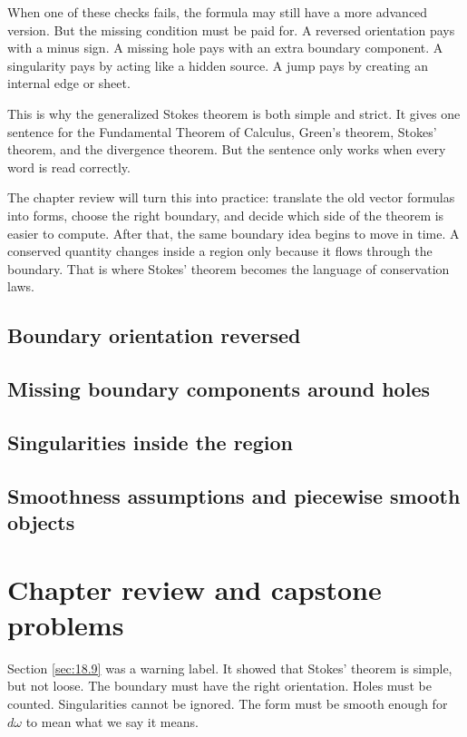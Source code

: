 When one of these checks fails, the formula may still have a more advanced version.
But the missing condition must be paid for.  A reversed orientation pays with a minus
sign.  A missing hole pays with an extra boundary component.  A singularity pays by
acting like a hidden source.  A jump pays by creating an internal edge or sheet.

This is why the generalized Stokes theorem is both simple and strict.  It gives one
sentence for the Fundamental Theorem of Calculus, Green's theorem, Stokes' theorem,
and the divergence theorem.  But the sentence only works when every word is read
correctly.

The chapter review will turn this into practice: translate the old vector formulas into
forms, choose the right boundary, and decide which side of the theorem is easier to
compute.  After that, the same boundary idea begins to move in time.  A conserved
quantity changes inside a region only because it flows through the boundary.  That is
where Stokes' theorem becomes the language of conservation laws.


\subsection{Boundary orientation reversed}

\subsection{Missing boundary components around holes}

\subsection{Singularities inside the region}

\subsection{Smoothness assumptions and piecewise smooth objects}

\section{Chapter review and capstone problems}
\label{sec:18.10}

Section \ref{sec:18.9} was a warning label.  It showed that Stokes' theorem is simple,
but not loose.  The boundary must have the right orientation.  Holes must be counted.
Singularities cannot be ignored.  The form must be smooth enough for \(d\omega\) to
mean what we say it means.

